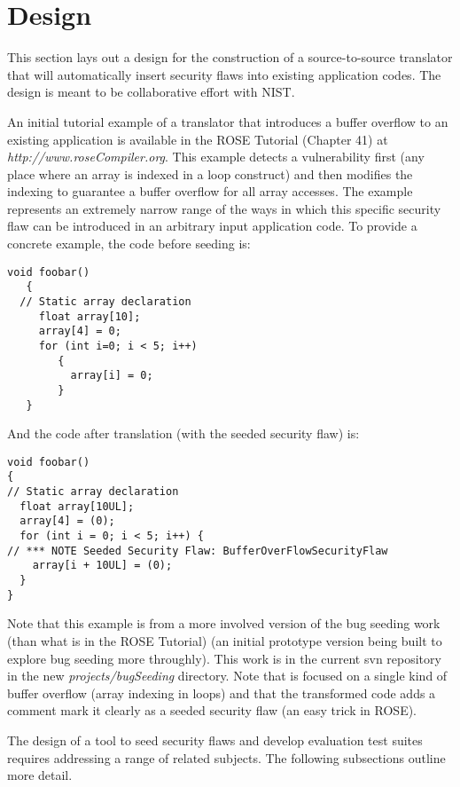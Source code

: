 \section{Design}

   This section lays out a design for the construction of a source-to-source
translator that will automatically insert security flaws into existing application codes.
The design is meant to be collaborative effort with NIST.

An initial tutorial example of a translator that introduces a 
buffer overflow to an existing application is available in the ROSE Tutorial
(Chapter 41) at {\em http://www.roseCompiler.org}.  This example detects a
vulnerability first (any place where an array is indexed in a loop construct)
and then modifies the indexing to guarantee a buffer overflow for all
array accesses.  The example represents an extremely narrow range of
the ways in which this specific security flaw can be introduced in an
arbitrary input application code.  To provide a concrete example, the code 
before seeding is:
{\mySmallFontSize
\begin{verbatim}
void foobar()
   {
  // Static array declaration
     float array[10];
     array[4] = 0;
     for (int i=0; i < 5; i++)
        {
          array[i] = 0;
        }
   }
\end{verbatim}
}
And the code after translation (with the seeded security flaw) is:
{\mySmallFontSize
\begin{verbatim}
void foobar()
{
// Static array declaration
  float array[10UL];
  array[4] = (0);
  for (int i = 0; i < 5; i++) {
// *** NOTE Seeded Security Flaw: BufferOverFlowSecurityFlaw 
    array[i + 10UL] = (0);
  }
}
\end{verbatim}
}
Note that this example is from a more involved version of the bug seeding
work (than what is in the ROSE Tutorial) (an initial prototype version being 
built to explore bug seeding more throughly). This work is in the current 
svn repository in the new {\em projects/bugSeeding} directory. Note that is
focused on a single kind of buffer overflow (array indexing in loops) and
that the transformed code adds a comment mark it clearly as a seeded security 
flaw (an easy trick in ROSE).

The design of a tool to seed security flaws and develop evaluation test suites requires
addressing a range of related subjects.  The following subsections outline more detail.
